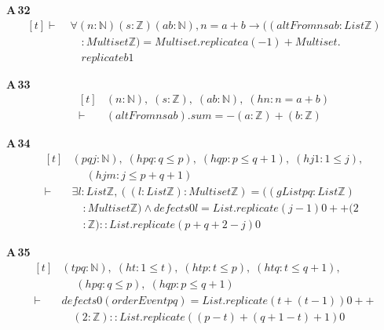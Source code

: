 \noindent\textbf{A\,32}\quad{}
{\footnotesize\[ \begin{aligned}[t]
\vdash\;&\forall (\mathit{n} : \mathbb{N} ) (\mathit{s} : \mathbb{Z} ) (\mathit{a} \mathit{b} : \mathbb{N} ), \mathit{n} = \mathit{a} + \mathit{b} \to ((\mathit{altFrom} \mathit{n} \mathit{s} \mathit{a} \mathit{b} : \mathit{List} \mathbb{Z} )\\
&\quad : \mathit{Multiset} \mathbb{Z} ) = \mathit{Multiset}.\mathit{replicate} \mathit{a} (-1) + \mathit{Multiset}.\\
&\quad \mathit{replicate} \mathit{b} 1
\end{aligned} \]}

\noindent\textbf{A\,33}\quad{}
{\footnotesize\[ \begin{aligned}[t]
&(\mathit{n} : \mathbb{N} ),\; (\mathit{s} : \mathbb{Z} ),\; (\mathit{a} \mathit{b} : \mathbb{N} ),\; (\mathit{hn} : \mathit{n} = \mathit{a} + \mathit{b})\\
\vdash\;&(\mathit{altFrom} \mathit{n} \mathit{s} \mathit{a} \mathit{b}).\mathit{sum} = -(\mathit{a}:\mathbb{Z} ) + (\mathit{b}:\mathbb{Z} )
\end{aligned} \]}

\noindent\textbf{A\,34}\quad{}
{\footnotesize\[ \begin{aligned}[t]
&(\mathit{p} \mathit{q} \mathit{j} : \mathbb{N} ),\; (\mathit{hpq} : \mathit{q} \leq \mathit{p}),\; (\mathit{hqp} : \mathit{p} \leq \mathit{q} + 1),\; (\mathit{hj1} : 1 \leq \mathit{j}),\\
&\quad \; (\mathit{hjm} : \mathit{j} \leq \mathit{p} + \mathit{q} + 1)\\
\vdash\;&\exists \mathit{l} : \mathit{List} \mathbb{Z} , ((\mathit{l} : \mathit{List} \mathbb{Z} ) : \mathit{Multiset} \mathbb{Z} ) = ((\mathit{gList} \mathit{p} \mathit{q} : \mathit{List} \mathbb{Z} )\\
&\quad : \mathit{Multiset} \mathbb{Z} ) \wedge \mathit{defects} 0 \mathit{l} = \mathit{List}.\mathit{replicate} (\mathit{j} - 1) 0 ++ (2\\
&\quad : \mathbb{Z} ) :: \mathit{List}.\mathit{replicate} (\mathit{p} + \mathit{q} + 2 - \mathit{j}) 0
\end{aligned} \]}

\noindent\textbf{A\,35}\quad{}
{\footnotesize\[ \begin{aligned}[t]
&(\mathit{t} \mathit{p} \mathit{q} : \mathbb{N} ),\; (\mathit{ht} : 1 \leq \mathit{t}),\; (\mathit{htp} : \mathit{t} \leq \mathit{p}),\; (\mathit{htq} : \mathit{t} \leq \mathit{q} + 1),\\
&\quad \; (\mathit{hpq} : \mathit{q} \leq \mathit{p}),\; (\mathit{hqp} : \mathit{p} \leq \mathit{q} + 1)\\
\vdash\;&\mathit{defects} 0 (\mathit{orderEven} \mathit{t} \mathit{p} \mathit{q}) = \mathit{List}.\mathit{replicate} (\mathit{t} + (\mathit{t} - 1)) 0 ++\\
&\quad (2 : \mathbb{Z} ) :: \mathit{List}.\mathit{replicate} ((\mathit{p} - \mathit{t}) + (\mathit{q} + 1 - \mathit{t}) + 1) 0
\end{aligned} \]}

